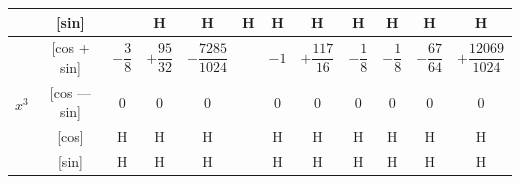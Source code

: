 \documentclass[11pt,a4paper]{book}
\begin{document}
{{\begin{center}
\begin{tabular}{|c|c|c|c|c|c|c|c|c|c|c|c|}
& [sin] & & H & H & H & H & H & H & H & H & H \\
\hline
\multirow{4}{*}{$x^3$} & [cos + sin] & $-\dfrac{3}{8}$ & $+\dfrac{95}{32}$ & $-\dfrac{7285}{1024}$ & & $-1$ & $+\dfrac{117}{16}$ & $-\dfrac{1}{8}$ & $-\dfrac{1}{8}$ & $-\dfrac{67}{64}$ & $+\dfrac{12069}{1024}$ \\
& [cos --- sin] & $0$ & $0$ & $0$ & & $0$ & $0$ & $0$ & $0$ & $0$ & $0$ \\
& [cos] & H & H & H & & H & H & H & H & H & H \\
& [sin] & H & H & H & & H & H & H & H & H & H \\
\hline
\end{tabular}
\end{center}

\vspace{1em}


}}
\end{document}
